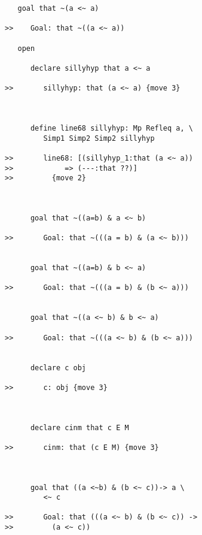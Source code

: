 \documentclass[12pt]{article}
\begin{document}
\begin{verbatim}
   goal that ~(a <~ a)

>>    Goal: that ~((a <~ a))

   open

      declare sillyhyp that a <~ a

>>       sillyhyp: that (a <~ a) {move 3}



      define line68 sillyhyp: Mp Refleq a, \
         Simp1 Simp2 Simp2 sillyhyp

>>       line68: [(sillyhyp_1:that (a <~ a))
>>            => (---:that ??)]
>>         {move 2}



      goal that ~((a=b) & a <~ b)

>>       Goal: that ~(((a = b) & (a <~ b)))


      goal that ~((a=b) & b <~ a)

>>       Goal: that ~(((a = b) & (b <~ a)))


      goal that ~((a <~ b) & b <~ a)

>>       Goal: that ~(((a <~ b) & (b <~ a)))


      declare c obj

>>       c: obj {move 3}



      declare cinm that c E M

>>       cinm: that (c E M) {move 3}



      goal that ((a <~b) & (b <~ c))-> a \
         <~ c

>>       Goal: that (((a <~ b) & (b <~ c)) ->
>>         (a <~ c))
\end{verbatim}
\end{document}
